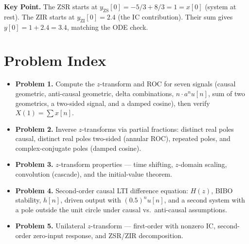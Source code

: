 \documentclass[11pt]{article}
\begin{document}
\medskip\noindent\textbf{Key Point.} The ZSR starts at $y_{\text{ZS}}[0]=-5/3+8/3=1=x[0]$ (system at rest). The ZIR starts at $y_{\text{ZI}}[0]=2.4$ (the IC contribution). Their sum gives $y[0]=1+2.4=3.4$, matching the ODE check.

\section*{Problem Index}

\begin{itemize}[leftmargin=*]
\item \textbf{Problem 1.} Compute the $z$-transform and ROC for seven signals (causal geometric, anti-causal geometric, delta combinations, $n\cdot a^{n}u[n]$, sum of two geometrics, a two-sided signal, and a damped cosine), then verify $X(1)=\sum x[n]$.
\item \textbf{Problem 2.} Inverse $z$-transforms via partial fractions: distinct real poles causal, distinct real poles two-sided (annular ROC), repeated poles, and complex-conjugate poles (damped cosine).
\item \textbf{Problem 3.} $z$-transform properties --- time shifting, $z$-domain scaling, convolution (cascade), and the initial-value theorem.
\item \textbf{Problem 4.} Second-order causal LTI difference equation: $H(z)$, BIBO stability, $h[n]$, driven output with $(0.5)^{n}u[n]$, and a second system with a pole outside the unit circle under causal vs.\ anti-causal assumptions.
\item \textbf{Problem 5.} Unilateral $z$-transform --- first-order with nonzero IC, second-order zero-input response, and ZSR/ZIR decomposition.
\end{itemize}
\end{document}
